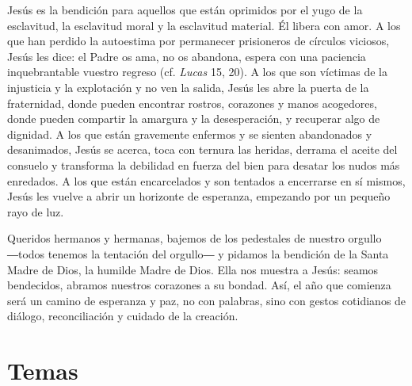 \begin{body}
	Jesús es la bendición para aquellos que están oprimidos por el yugo de la esclavitud, la esclavitud moral y la esclavitud material. Él libera con amor. A los que han perdido la autoestima por permanecer prisioneros de círculos viciosos, Jesús les dice: el Padre os ama, no os abandona, espera con una paciencia inquebrantable vuestro regreso (cf. \emph{Lucas} 15, 20). A los que son víctimas de la injusticia y la explotación y no ven la salida, Jesús les abre la puerta de la fraternidad, donde pueden encontrar rostros, corazones y manos acogedores, donde pueden compartir la amargura y la desesperación, y recuperar algo de dignidad. A los que están gravemente enfermos y se sienten abandonados y desanimados, Jesús se acerca, toca con ternura las heridas, derrama el aceite del consuelo y transforma la debilidad en fuerza del bien para desatar los nudos más enredados. A los que están encarcelados y son tentados a encerrarse en sí mismos, Jesús les vuelve a abrir un horizonte de esperanza, empezando por un pequeño rayo de luz.
	
	Queridos hermanos y hermanas, bajemos de los pedestales de nuestro orgullo ―todos tenemos la tentación del orgullo― y pidamos la bendición de la Santa Madre de Dios, la humilde Madre de Dios. Ella nos muestra a Jesús: seamos bendecidos, abramos nuestros corazones a su bondad. Así, el año que comienza será un camino de esperanza y paz, no con palabras, sino con gestos cotidianos de diálogo, reconciliación y cuidado de la creación.
\end{body}


\newsection

\section{Temas}
